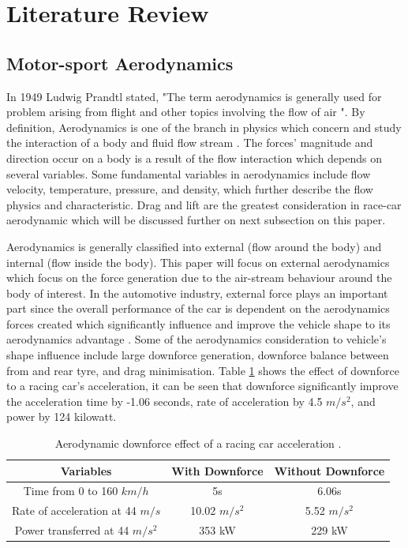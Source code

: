 \section{Literature Review}

\subsection{Motor-sport Aerodynamics}
In 1949 Ludwig Prandtl stated, "The term aerodynamics is generally used for problem arising from flight and other topics involving the flow of air \cite{Anderson2007FundamentalsJr.}". By definition, Aerodynamics is one of the branch in physics which concern and study the interaction of a body and fluid flow stream \cite{Scibor-Rylski1984RoadAerodynamics}. The forces' magnitude and direction occur on a body is a result of the flow interaction which depends on several variables. Some fundamental variables in aerodynamics include flow velocity, temperature, pressure, and density, which further describe the flow physics and characteristic. Drag and lift are the greatest consideration in race-car aerodynamic which will be discussed further on next subsection on this paper.

\noindent Aerodynamics is generally classified into external (flow around  the body) and internal (flow inside the body). This paper will focus on external aerodynamics which focus on the force generation due to the air-stream behaviour around the body of interest. In the automotive industry, external force plays an important part since the overall performance of the car is dependent on the aerodynamics forces created which significantly influence and improve the vehicle shape to its aerodynamics advantage \cite{Scibor-Rylski1984RoadAerodynamics}. Some of the aerodynamics consideration to vehicle's shape influence include large downforce generation, downforce balance between from and rear tyre, and drag minimisation. Table \ref{Table1} shows the effect of downforce to a racing car's acceleration, it can be seen that downforce significantly improve the acceleration time by -1.06 seconds, rate of acceleration by 4.5 $m/s^2$, and power by 124 kilowatt. 

\begin{table}[!ht]
\caption{\label{Table1} Aerodynamic downforce effect of a racing car acceleration \cite{Scibor-Rylski1984RoadAerodynamics}.}
\vspace{-5mm}
\begin{center}
 \begin{tabular}{||c| c| c ||} 
 \hline
 Variables & With Downforce & Without Downforce \\ [0.5ex] 
 \hline\hline
 Time from 0 to 160 $km/h$ & 5s & 6.06s \\ 
 \hline
 Rate of acceleration at 44 $m/s$ & 10.02 $m/s^{2}$ & 5.52 $m/s^2$ \\
 \hline
 Power transferred at 44 $m/s^2$ & 353 kW & 229 kW  \\
 \hline
\end{tabular}
\end{center}
\end{table}

